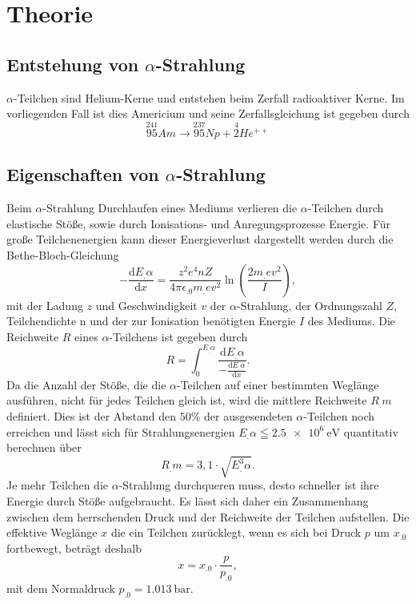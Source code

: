 \section{Theorie}
\label{sec:Theorie}
\subsection{Entstehung von $\alpha$-Strahlung}

$\alpha$-Teilchen sind Helium-Kerne und entstehen beim Zerfall radioaktiver Kerne.\newline
Im vorliegenden Fall ist dies Americium und seine Zerfallsgleichung ist gegeben durch
\[
\overset{241}{95}Am\rightarrow\overset{237}{95}Np + \overset{4}{2} He^{++}
\]

\subsection{Eigenschaften von $\alpha$-Strahlung}
Beim $\alpha$-Strahlung Durchlaufen eines Mediums verlieren die $\alpha$-Teilchen durch elastische Stöße, sowie durch Ionisations- und Anregungsprozesse Energie.
Für große Teilchenenergien kann dieser Energieverlust dargestellt werden durch die Bethe-Bloch-Gleichung
\begin{equation}
-\frac{\mathrm{d}E_.{\alpha}}{\mathrm{d}x}=\frac{z^2e^4nZ}{4\pi\epsilon_.0m_.ev^2}\ln\left(\frac{2m_.ev^2}{I}\right)\label{eq:dE},
\end{equation}
mit der Ladung $z$ und Geschwindigkeit $v$ der $\alpha$-Strahlung, der Ordnungszahl $Z$, Teilchendichte n und der zur Ionisation benötigten Energie $I$ des Mediums.
Die Reichweite $R$ eines $\alpha$-Teilchens ist gegeben durch
\begin{equation}
R=\int_0^{E_.{\alpha}}\frac{\mathrm{d}E_.{\alpha}}{-\frac{\mathrm{d}E_.{\alpha}}{\mathrm{d}x}}\text{.}
\end{equation}
Da die Anzahl der Stöße, die die $\alpha$-Teilchen auf einer bestimmten Weglänge ausführen, nicht für jedes Teilchen gleich ist, wird die mittlere Reichweite $R_.m$ definiert.
Dies ist der Abstand den $50\%$ der ausgesendeten $\alpha$-Teilchen noch erreichen und lässt sich für Strahlungsenergien $E_.{\alpha}\leqq\SI{2,5e6}{\electronvolt}$ quantitativ berechnen über
\begin{equation}
R_.m=3,1\cdot\sqrt{E^3_.{\alpha}}\label{eq:Rm}\text{.}
\end{equation}
Je mehr Teilchen die $\alpha$-Strahlung durchqueren muss, desto schneller ist ihre Energie durch Stöße aufgebraucht. Es lässt sich daher ein Zusammenhang zwischen dem herrschenden Druck und der Reichweite der Teilchen aufstellen. Die effektive Weglänge $x$ die ein Teilchen zurücklegt, wenn es sich bei Druck $p$ um $x_.0$ fortbewegt, beträgt deshalb
\begin{equation}
x=x_.0\cdot\frac{p}{p_.0}\label{eq:x},
\end{equation}
mit dem Normaldruck $p_.0=\SI{1,013}{\bar}$.